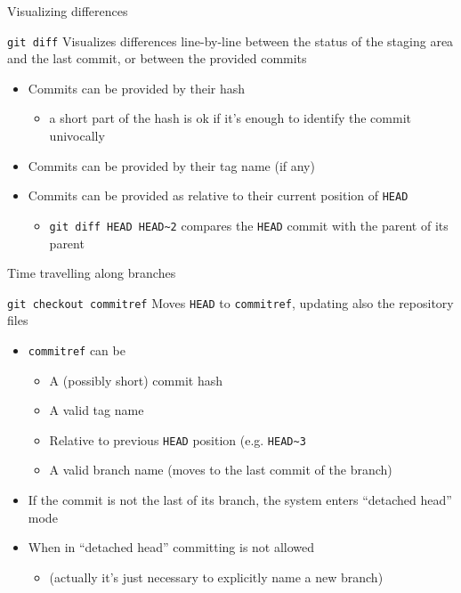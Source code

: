 \documentclass[presentation]{beamer}
\begin{document}
\begin{frame}{Visualizing differences}
    \begin{block}{\texttt{git diff}}
        Visualizes differences line-by-line between the status of the staging area and the last commit, or between the provided commits
        \begin{itemize}
            \item Commits can be provided by their hash
            \begin{itemize}
                \item a short part of the hash is ok if it's enough to identify the commit univocally
            \end{itemize}
            \item Commits can be provided by their tag name (if any)
            \item Commits can be provided as relative to their current position of \texttt{HEAD}
            \begin{itemize}
                \item \texttt{git diff HEAD HEAD\textasciitilde{}2} compares the \texttt{HEAD} commit with the parent of its parent
            \end{itemize}
        \end{itemize}
    \end{block}
\end{frame}

\begin{frame}{Time travelling along branches}
    \begin{block}{\texttt{git checkout commitref}}
        Moves \texttt{HEAD} to \texttt{commitref}, updating also the repository files
        \begin{itemize}
            \item \texttt{commitref} can be
            \begin{itemize}
                \item A (possibly short) commit hash
                \item A valid tag name
                \item Relative to previous \texttt{HEAD} position (e.g. \texttt{HEAD\textasciitilde{}3}
                \item A valid branch name (moves to the last commit of the branch)
            \end{itemize}
            \item If the commit is not the last of its branch, the system enters ``detached head'' mode
            \item When in ``detached head'' committing is not allowed
            \begin{itemize}
                \item (actually it's just necessary to explicitly name a new branch)
            \end{itemize}
        \end{itemize}
    \end{block}
\end{frame}
\end{document}
